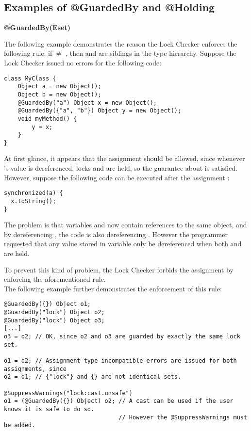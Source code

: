 \subsection{Examples of @GuardedBy and @Holding\label{lock-examples-guardedby-and-holding}}

\textbf{@GuardedBy(Eset)}

The following example demonstrates the reason the Lock Checker enforces the
following rule:  if  $\neq$ , then
 and  are siblings in the type
hierarchy.  Suppose the Lock Checker issued no errors for the following code:

\begin{Verbatim}
class MyClass {
    Object a = new Object();
    Object b = new Object();
    @GuardedBy("a") Object x = new Object();
    @GuardedBy({"a", "b"}) Object y = new Object();
    void myMethod() {
        y = x;
    }
}
\end{Verbatim}

At first glance, it appears that the assignment should be allowed, since
whenever 's value is dereferenced, locks  and  are
held, so the guarantee about  is satisfied.  However, suppose the
following code can be executed after the assignment :

\begin{Verbatim}
synchronized(a) {
  x.toString();
}
\end{Verbatim}

The problem is that variables  and  now contain references to
the same object, and by dereferencing , the code is also dereferencing
.  However the programmer requested that any value stored in variable
 only be dereferenced when both  and  are held.

To prevent this kind of problem, the Lock Checker forbids the assignment
 by enforcing the aforementioned rule.
\\

The following example further demonstrates the enforcement of this rule:

\begin{Verbatim}
@GuardedBy({}) Object o1;
@GuardedBy("lock") Object o2;
@GuardedBy("lock") Object o3;
[...]
o3 = o2; // OK, since o2 and o3 are guarded by exactly the same lock set.

o1 = o2; // Assignment type incompatible errors are issued for both assignments, since
o2 = o1; // {"lock"} and {} are not identical sets.

@SuppressWarnings("lock:cast.unsafe")
o1 = (@GuardedBy({}) Object) o2; // A cast can be used if the user knows it is safe to do so.
                                 // However the @SuppressWarnings must be added.
\end{Verbatim}





